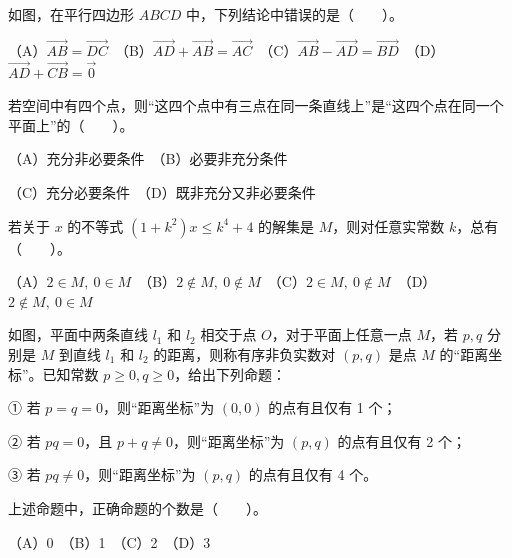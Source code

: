 \Needspace{0.4\textheight}
\begin{question}
如图，在平行四边形 $ABCD$ 中，下列结论中错误的是\mbox{（　　）}。

（A）$\overrightarrow{AB}=\overrightarrow{DC}$　（B）$\overrightarrow{AD}+\overrightarrow{AB}=\overrightarrow{AC}$　（C）$\overrightarrow{AB}-\overrightarrow{AD}=\overrightarrow{BD}$　（D）$\overrightarrow{AD}+\overrightarrow{CB}=\vec 0$
\nopagebreak[4]
\begin{center}\end{center}
\nopagebreak[4]
\end{question}
\begin{question}
若空间中有四个点，则“这四个点中有三点在同一条直线上”是“这四个点在同一个平面上”的\mbox{（　　）}。

（A）充分非必要条件　（B）必要非充分条件

（C）充分必要条件　（D）既非充分又非必要条件

\end{question}
\begin{question}
若关于 $x$ 的不等式 $(1+k^2)x\le k^4+4$ 的解集是 $M$，则对任意实常数 $k$，总有\mbox{（　　）}。

（A）$2\in M,\ 0\in M$　（B）$2\notin M,\ 0\notin M$　（C）$2\in M,\ 0\notin M$　（D）$2\notin M,\ 0\in M$

\Needspace{0.4\textheight}
\end{question}
\begin{question}
如图，平面中两条直线 $l_1$ 和 $l_2$ 相交于点 $O$，对于平面上任意一点 $M$，若 $p,q$ 分别是 $M$ 到直线 $l_1$ 和 $l_2$ 的距离，则称有序非负实数对 $(p,q)$ 是点 $M$ 的“距离坐标”。已知常数 $p\ge0,q\ge0$，给出下列命题：

① 若 $p=q=0$，则“距离坐标”为 $(0,0)$ 的点有且仅有 1 个；

② 若 $pq=0$，且 $p+q\ne0$，则“距离坐标”为 $(p,q)$ 的点有且仅有 2 个；

③ 若 $pq\ne0$，则“距离坐标”为 $(p,q)$ 的点有且仅有 4 个。

上述命题中，正确命题的个数是\mbox{（　　）}。

（A）0　（B）1　（C）2　（D）3
\nopagebreak[4]
\begin{center}\end{center}
\nopagebreak[4]
\end{question}

